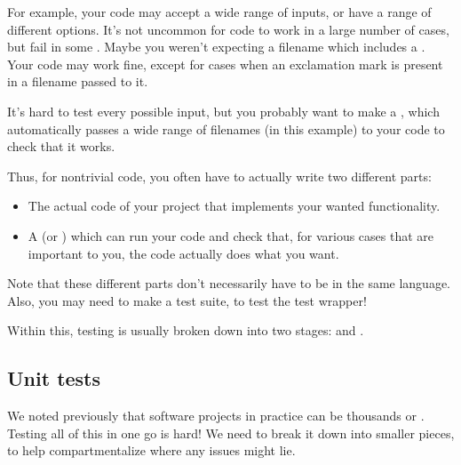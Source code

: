 \documentclass[letterpaper,10pt,british]{sphinxmanual}
\begin{document}
\sphinxAtStartPar
For example, your code may accept a wide range of inputs, or have a range of different options. It’s not uncommon for code to work in a large number of cases, but fail in some . Maybe you weren’t expecting a filename which includes a . Your code may work fine, except for cases when an exclamation mark  is present in a filename passed to it.

\sphinxAtStartPar
It’s hard to test every possible input, but you probably want to make a , which automatically passes a wide range of filenames (in this example) to your code to check that it works.

\sphinxAtStartPar
Thus, for non\sphinxhyphen{}trivial code, you often have to actually write two different parts:
\begin{itemize}
\item {} 
\sphinxAtStartPar
The actual code of your project that implements your wanted functionality.

\item {} 
\sphinxAtStartPar
A  (or ) which can run your code and check that, for various cases that are important to you, the code actually does what you want.

\end{itemize}

\sphinxAtStartPar
Note that these different parts don’t necessarily have to be in the same language. Also, you may need to make a test suite, to test the test wrapper!

\sphinxAtStartPar
Within this, testing is usually broken down into two stages:  and .


\subsection{Unit tests}
\label{\detokenize{chapters/software_development_tools/automated_testing:unit-tests}}\label{\detokenize{chapters/software_development_tools/automated_testing:unit-testing}}
\sphinxAtStartPar
We noted previously that software projects in practice can be thousands or {\hyperref[\detokenize{chapters/computer_software/files_and_folders:files-folders-filesystems}]{}}. Testing all of this in one go is hard! We need to break it down into smaller pieces, to help compartmentalize where any issues might lie.
\end{document}
